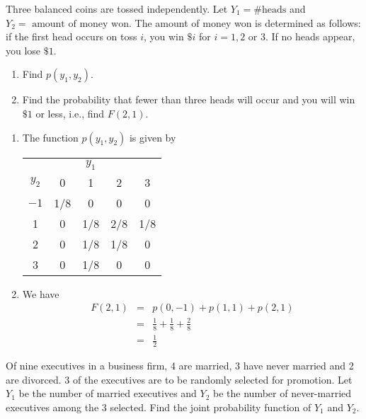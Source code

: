 \begin{exercise}{}{}
Three balanced coins are tossed independently. Let $Y_1 = \#\text{heads}$ and $Y_2 = \text{ amount of money won}$. The amount of money won is determined as follows: if the first head occurs on toss $i$, you win $\$i$ for $i=1, 2\text{ or }3$. If no heads appear, you lose $\$1$.
	\begin{enumerate}
		\item Find $p(y_1, y_2)$.
		\item Find the probability that fewer than three heads will occur and you will win $\$1$ or less, i.e., find $F(2,1)$.
	\end{enumerate}
\end{exercise}
\begin{solution}
	\begin{enumerate}
		\item The function $p(y_1, y_2)$ is given by
		\begin{center}
			\begin{tabular}{c | c c c c}
				& & $y_1$ & & \\ \cline{2-5}
				$y_2$& 0 & 1 & 2 & 3 \\ \hline 
				$-1$ & 1/8 & 0 & 0 & 0 \\
				1 & 0 & 1/8 & 2/8 & 1/8 \\
				2 & 0 & 1/8 & 1/8 & 0 \\
				3 & 0 & 1/8 & 0 & 0
			\end{tabular}
		\end{center}
		\item We have
		\begin{eqnarray*}
			F(2,1) &=& p(0,-1) + p(1,1) + p(2,1) \\
			&=& \frac{1}{8} + \frac{1}{8} + \frac{2}{8}\\
			&=& \frac{1}{2} 
		\end{eqnarray*}
	\end{enumerate}
\end{solution}

\begin{exercise}{}{}
	Of nine executives in a business firm, 4 are married, 3 have never married and 2 are divorced. 3 of the executives are to be randomly selected for promotion. Let $Y_1$ be the number of married executives and $Y_2$ be the number of never-married executives among the 3 selected. Find the joint probability function of $Y_1$ and $Y_2$.
\end{exercise}

